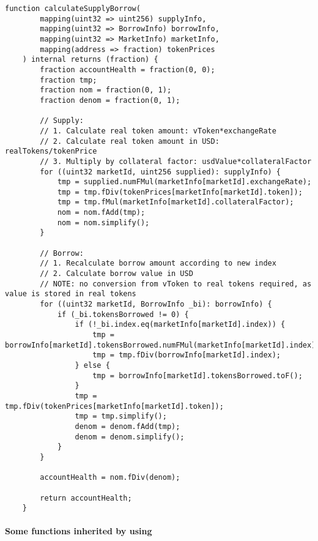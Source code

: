 \begin{lstlisting}[firstnumber=90]
    function calculateSupplyBorrow(
        mapping(uint32 => uint256) supplyInfo,
        mapping(uint32 => BorrowInfo) borrowInfo,
        mapping(uint32 => MarketInfo) marketInfo,
        mapping(address => fraction) tokenPrices
    ) internal returns (fraction) {
        fraction accountHealth = fraction(0, 0);
        fraction tmp;
        fraction nom = fraction(0, 1);
        fraction denom = fraction(0, 1);

        // Supply:
        // 1. Calculate real token amount: vToken*exchangeRate
        // 2. Calculate real token amount in USD: realTokens/tokenPrice
        // 3. Multiply by collateral factor: usdValue*collateralFactor
        for ((uint32 marketId, uint256 supplied): supplyInfo) {
            tmp = supplied.numFMul(marketInfo[marketId].exchangeRate);
            tmp = tmp.fDiv(tokenPrices[marketInfo[marketId].token]);
            tmp = tmp.fMul(marketInfo[marketId].collateralFactor);
            nom = nom.fAdd(tmp);
            nom = nom.simplify();
        }

        // Borrow:
        // 1. Recalculate borrow amount according to new index
        // 2. Calculate borrow value in USD
        // NOTE: no conversion from vToken to real tokens required, as value is stored in real tokens
        for ((uint32 marketId, BorrowInfo _bi): borrowInfo) {
            if (_bi.tokensBorrowed != 0) {
                if (!_bi.index.eq(marketInfo[marketId].index)) {
                    tmp = borrowInfo[marketId].tokensBorrowed.numFMul(marketInfo[marketId].index);
                    tmp = tmp.fDiv(borrowInfo[marketId].index);
                } else {
                    tmp = borrowInfo[marketId].tokensBorrowed.toF();
                }
                tmp = tmp.fDiv(tokenPrices[marketInfo[marketId].token]);
                tmp = tmp.simplify();
                denom = denom.fAdd(tmp);
                denom = denom.simplify();
            }
        }

        accountHealth = nom.fDiv(denom);

        return accountHealth;
    }
\end{lstlisting}
\paragraph{Some functions inherited by using}
